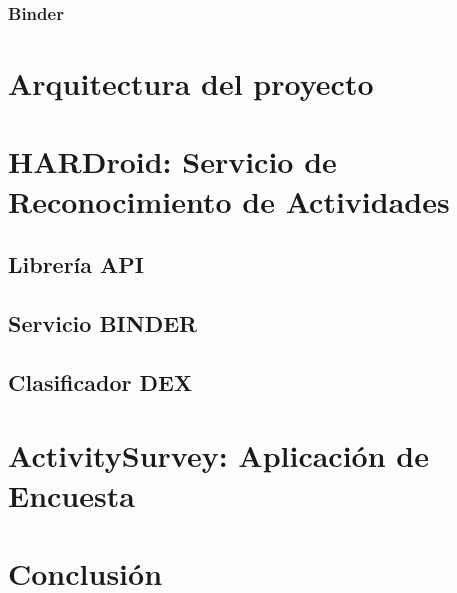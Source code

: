 \subsubsection{Binder}

\section{Arquitectura del proyecto}

\label{sec53:arquitectura}

\section{HARDroid: Servicio de Reconocimiento de Actividades}

\label{sec54:hardroid}

\subsection{Librería API}

\subsection{Servicio BINDER}

\subsection{Clasificador DEX}

\section{ActivitySurvey: Aplicación de Encuesta}

\label{sec55:activity}

\section{Conclusión}

\label{sec56:conclusion}
